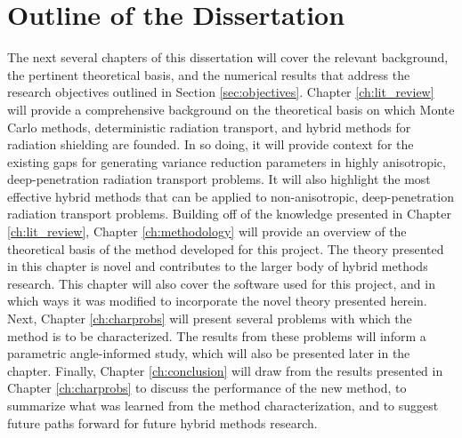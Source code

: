 \section{Outline of the Dissertation}
\label{sec:outline}

The next several chapters of this dissertation will cover the relevant
background, the pertinent theoretical basis, and the numerical results that
address the research objectives outlined in Section \ref{sec:objectives}.
Chapter \ref{ch:lit_review} will provide a
comprehensive background on the theoretical basis on which Monte Carlo methods,
deterministic radiation transport, and hybrid methods for radiation shielding
are founded. In so doing, it will provide context for the existing gaps for
generating variance reduction parameters in
highly anisotropic, deep-penetration radiation transport problems. It will also
highlight the most effective hybrid methods that can be applied to
non-anisotropic, deep-penetration radiation transport problems. Building off of
the knowledge presented in Chapter \ref{ch:lit_review},
Chapter \ref{ch:methodology} will provide an overview of the
theoretical basis of the method developed for this project. The theory
presented in this chapter is novel and contributes to the larger body of hybrid
methods research. This chapter will also cover the software used for this
project, and in which ways it was modified to incorporate the novel theory
presented herein. Next, Chapter \ref{ch:charprobs} will present several problems
with which the method is to be characterized. The results from these problems
will inform a parametric angle-informed study, which will also be presented
later in the chapter. Finally, Chapter \ref{ch:conclusion} will draw from the
results presented in Chapter \ref{ch:charprobs} to discuss the performance of
the new method, to summarize what was learned from the method characterization,
and to suggest future paths forward for future hybrid methods research.



